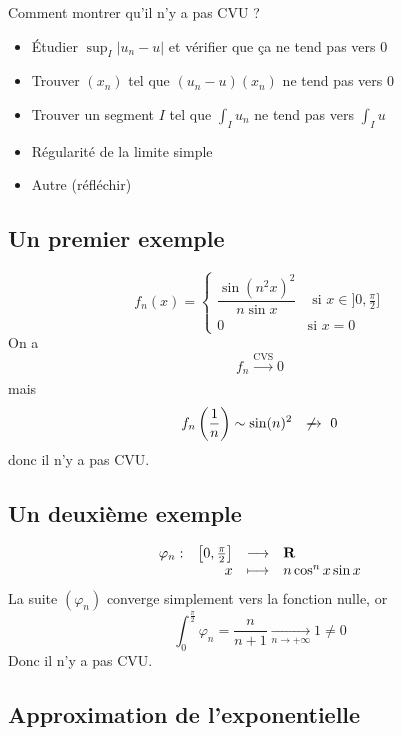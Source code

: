 Comment montrer qu'il n'y a pas CVU ?
\begin{itemize}
    \item Étudier $\sup_I|u_n-u|$ et vérifier que ça ne tend pas vers  $0$
    \item Trouver  $(x_n)$ tel que  $(u_n-u)(x_n)$ ne tend pas vers  $0$
    \item Trouver un segment  $I$ tel que  $\int_I u_n$ ne tend pas vers  $\int_Iu$
    \item Régularité de la limite simple
    \item Autre (réfléchir)
\end{itemize}

\subsection{Un premier exemple}

\[
    f_n(x)= \begin{cases}
        \dfrac{\sin(n^2x)^2}{n\sin x} &\text{ si } x \in  ]0, \frac{\pi}{2}]\\
        0 &\text{si }x=0
    \end{cases}
\] 
On a \[
    f_n \xrightarrow[]{\text{CVS}}0
\] 
mais \[
    f_n \left( \frac{1}{n} \right) \underset{}\sim \sin(n)^2 \xnrightarrow{}0
\] 
donc il n'y a pas CVU.

\subsection{Un deuxième exemple}

\[
    \begin{array}{rrcl}
    \varphi_n:& \left[ 0, \frac{\pi}{2} \right] & \longrightarrow & \mathbf R \\
    & x & \longmapsto & n\cos^n x\sin x
\end{array}
\] 
La suite $(\varphi_n)$ converge simplement vers la fonction nulle, or  \[
    \int_{0}^{\frac{\pi }{2}} \varphi_n=\frac{n}{n+1} \xrightarrow[n\to+\infty]{}1\neq 0
\] 
Donc il n'y a pas CVU.

\subsection{Approximation de l'exponentielle}

